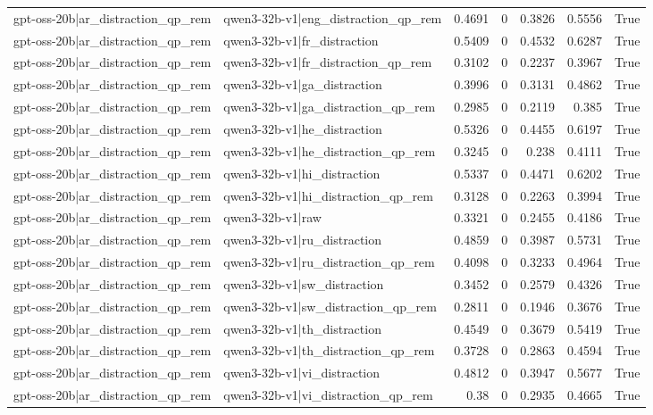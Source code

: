 \begin{table}
\begin{tabular}{l l r r r r l}
gpt-oss-20b|ar_distraction_qp_rem & qwen3-32b-v1|eng_distraction_qp_rem & 0.4691 & 0 & 0.3826 & 0.5556 & True \\
gpt-oss-20b|ar_distraction_qp_rem & qwen3-32b-v1|fr_distraction & 0.5409 & 0 & 0.4532 & 0.6287 & True \\
gpt-oss-20b|ar_distraction_qp_rem & qwen3-32b-v1|fr_distraction_qp_rem & 0.3102 & 0 & 0.2237 & 0.3967 & True \\
gpt-oss-20b|ar_distraction_qp_rem & qwen3-32b-v1|ga_distraction & 0.3996 & 0 & 0.3131 & 0.4862 & True \\
gpt-oss-20b|ar_distraction_qp_rem & qwen3-32b-v1|ga_distraction_qp_rem & 0.2985 & 0 & 0.2119 & 0.385 & True \\
gpt-oss-20b|ar_distraction_qp_rem & qwen3-32b-v1|he_distraction & 0.5326 & 0 & 0.4455 & 0.6197 & True \\
gpt-oss-20b|ar_distraction_qp_rem & qwen3-32b-v1|he_distraction_qp_rem & 0.3245 & 0 & 0.238 & 0.4111 & True \\
gpt-oss-20b|ar_distraction_qp_rem & qwen3-32b-v1|hi_distraction & 0.5337 & 0 & 0.4471 & 0.6202 & True \\
gpt-oss-20b|ar_distraction_qp_rem & qwen3-32b-v1|hi_distraction_qp_rem & 0.3128 & 0 & 0.2263 & 0.3994 & True \\
gpt-oss-20b|ar_distraction_qp_rem & qwen3-32b-v1|raw & 0.3321 & 0 & 0.2455 & 0.4186 & True \\
gpt-oss-20b|ar_distraction_qp_rem & qwen3-32b-v1|ru_distraction & 0.4859 & 0 & 0.3987 & 0.5731 & True \\
gpt-oss-20b|ar_distraction_qp_rem & qwen3-32b-v1|ru_distraction_qp_rem & 0.4098 & 0 & 0.3233 & 0.4964 & True \\
gpt-oss-20b|ar_distraction_qp_rem & qwen3-32b-v1|sw_distraction & 0.3452 & 0 & 0.2579 & 0.4326 & True \\
gpt-oss-20b|ar_distraction_qp_rem & qwen3-32b-v1|sw_distraction_qp_rem & 0.2811 & 0 & 0.1946 & 0.3676 & True \\
gpt-oss-20b|ar_distraction_qp_rem & qwen3-32b-v1|th_distraction & 0.4549 & 0 & 0.3679 & 0.5419 & True \\
gpt-oss-20b|ar_distraction_qp_rem & qwen3-32b-v1|th_distraction_qp_rem & 0.3728 & 0 & 0.2863 & 0.4594 & True \\
gpt-oss-20b|ar_distraction_qp_rem & qwen3-32b-v1|vi_distraction & 0.4812 & 0 & 0.3947 & 0.5677 & True \\
gpt-oss-20b|ar_distraction_qp_rem & qwen3-32b-v1|vi_distraction_qp_rem & 0.38 & 0 & 0.2935 & 0.4665 & True \\

\end{tabular}
\end{table}
